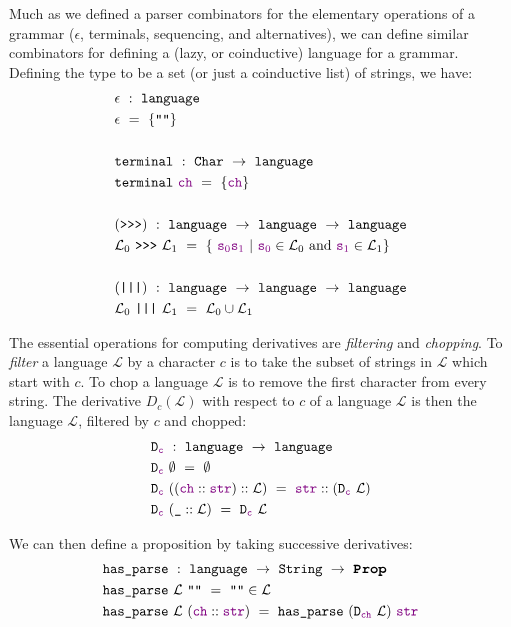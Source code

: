     Much as we defined a parser combinators for the elementary operations of a grammar ($\epsilon$, terminals, sequencing, and alternatives), we can define similar combinators for defining a (lazy, or coinductive) language for a grammar.  Defining the type  to be a set (or just a coinductive list) of strings, we have:
\begin{align*}
& \epsilon~:~\fname{language} \\
& \epsilon~=~\{\str{}\} \\ \\
& \fname{terminal}~:~\indname{Char}~\to~\fname{language} \\
& \fname{terminal}~\farg{ch}~=~\{\farg{ch}\} \\ \\
& (\fname{\sequencing})~:~\fname{language}~\to~\fname{language}~\to~\fname{language} \\
& \mathcal{L}_0~\fname{\sequencing}~\mathcal{L}_1~=~\{~\strcat{\farg{s\ensuremath{_0}}}{\farg{s\ensuremath{_1}}}~|~\farg{s\ensuremath{_0}}\in\mathcal L_0\text{ and }\farg{s\ensuremath{_1}}\in\mathcal{L}_1 \} \\ \\
& (\fname{|||})~:~\fname{language}~\to~\fname{language}~\to~\fname{language} \\
& \mathcal{L}_0~\fname{|||}~\mathcal{L}_1~=~\mathcal L_0\cup\mathcal L_1
\end{align*}

    The essential operations for computing derivatives are \emph{filtering} and \emph{chopping}.  To \emph{filter} a language $\mathcal L$ by a character $c$ is to take the subset of strings in $\mathcal L$ which start with $c$.  To chop a language $\mathcal L$ is to remove the first character from every string.  The derivative $D_c(\mathcal L)$ with respect to $c$ of a language $\mathcal L$ is then the language $\mathcal L$, filtered by $c$ and chopped:
\begin{align*}
&\texttt{D}_{\textcolor{violet}{\texttt{c}}}~:~\texttt{language}~\to~\texttt{language} \\
&\texttt{D}_{\textcolor{violet}{\texttt{c}}}~\emptyset~=~\emptyset \\
&\texttt{D}_{\textcolor{violet}{\texttt{c}}}~((\textcolor{violet}{\texttt{ch}}::\textcolor{violet}{\texttt{str}})::\mathcal L)~=~\textcolor{violet}{\texttt{str}}::(\texttt{D}_{\textcolor{violet}{\texttt{c}}}~\mathcal{L}) \\
&\texttt{D}_{\textcolor{violet}{\texttt{c}}}~(\texttt{\_}::\mathcal L)~=~\texttt{D}_{\textcolor{violet}{\texttt{c}}}~\mathcal{L}
\end{align*}

      We can then define a  proposition by taking successive derivatives:
\begin{align*}
&\fname{has\_parse}~:~\coqtype{language}~\to~\coqtype{String}~\to~\Prop \\
&\fname{has\_parse}~\mathcal{L}~\str{}~=~\str{}\in\mathcal{L} \\
&\fname{has\_parse}~\mathcal{L}~(\cons{\farg{ch}}{\farg{str}})~=~\fname{has\_parse}~(\fname{D\ensuremath{_{\farg{ch}}}}~\mathcal L)~\farg{str} \\
\end{align*}
      
